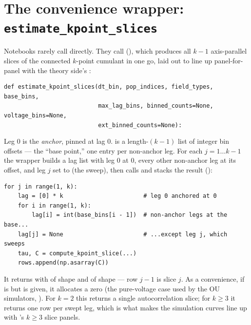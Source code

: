 \section{The convenience wrapper: \texttt{estimate\_kpoint\_slices}}

Notebooks rarely call  directly. They call
 (), which produces
all $k-1$ axis-parallel slices of the connected $k$-point cumulant in one go,
laid out to line up panel-for-panel with the theory side's
:

\begin{lstlisting}
def estimate_kpoint_slices(dt_bin, pop_indices, field_types, base_bins,
                           max_lag_bins, binned_counts=None, voltage_bins=None,
                           ext_binned_counts=None):
\end{lstlisting}

Leg 0 is the \emph{anchor}, pinned at lag 0.  is a length-$(k-1)$
list of integer bin offsets --- the ``base point,'' one entry per non-anchor leg.
For each $j = 1\ldots k-1$ the wrapper builds a lag list with leg 0 at 0, every
other non-anchor leg at its  offset, and leg $j$ set to
 (the sweep), then calls  and stacks the
result ():

\begin{lstlisting}
for j in range(1, k):
    lag = [0] * k                       # leg 0 anchored at 0
    for i in range(1, k):
        lag[i] = int(base_bins[i - 1])  # non-anchor legs at the base...
    lag[j] = None                       # ...except leg j, which sweeps
    tau, C = compute_kpoint_slice(...)
    rows.append(np.asarray(C))
\end{lstlisting}

It returns  with  of shape
 and  of shape
 --- row $j-1$ is slice $j$. As a convenience, if
 is  but  is given, it
allocates a zero  (the pure-voltage case used by the OU
simulators, ). For $k=2$ this returns a
single autocorrelation slice; for $k\ge 3$ it returns one row per swept leg, which
is what makes the simulation curves line up with 's $k\ge3$
slice panels.

